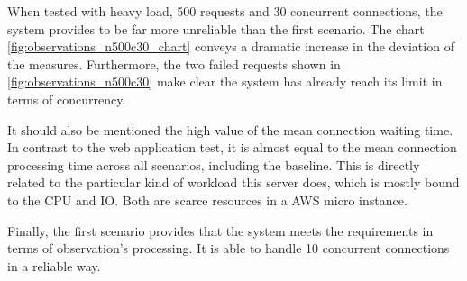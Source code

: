 When tested with heavy load, 500 requests and 30 concurrent connections, the system provides to be far more unreliable than the first scenario. The chart \ref{fig:observations_n500c30_chart} conveys a dramatic increase in the deviation of the measures. Furthermore, the two failed requests shown in \ref{fig:observations_n500c30} make clear the system has already reach its limit in terms of concurrency.

It should also be mentioned the high value of the mean connection waiting time. In contrast to the web application test, it is almost equal to the mean connection processing time across all scenarios, including the baseline. This is directly related to the particular kind of workload this server does, which is mostly bound to the CPU and IO. Both are scarce resources in a AWS micro instance.

Finally, the first scenario provides that the system meets the requirements in terms of observation's processing. It is able to handle 10 concurrent connections in a reliable way.


